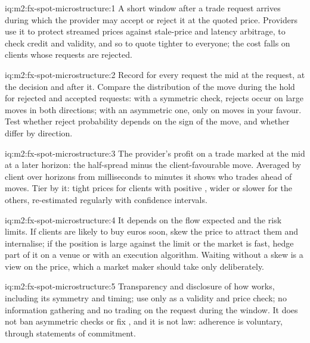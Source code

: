\begin{solution}{iq:m2:fx-spot-microstructure:1}
A short window after a trade request arrives during which the provider may
accept or reject it at the quoted price. Providers use it to protect streamed
prices against stale-price and latency arbitrage, to check credit and validity,
and so to quote tighter to everyone; the cost falls on clients whose requests
are rejected.
\end{solution}

\begin{solution}{iq:m2:fx-spot-microstructure:2}
Record for every request the mid at the request, at the decision and after it.
Compare the distribution of the move during the hold for rejected and accepted
requests: with a symmetric check, rejects occur on large moves in both
directions; with an asymmetric one, only on moves in your favour. Test whether
reject probability depends on the sign of the move, and whether 
differ by direction.
\end{solution}

\begin{solution}{iq:m2:fx-spot-microstructure:3}
The provider's profit on a trade marked at the mid at a later horizon: the
half-spread minus the client-favourable move. Averaged by client over horizons
from milliseconds to minutes it shows who trades ahead of moves. Tier by it:
tight prices for clients with positive , wider or slower for the
others, re-estimated regularly with confidence intervals.
\end{solution}

\begin{solution}{iq:m2:fx-spot-microstructure:4}
It depends on the flow expected and the risk limits. If clients are likely to
buy euros soon, skew the price to attract them and internalise; if the position
is large against the limit or the market is fast, hedge part of it on a venue or
with an execution algorithm. Waiting without a skew is a view on the price,
which a market maker should take only deliberately.
\end{solution}

\begin{solution}{iq:m2:fx-spot-microstructure:5}
Transparency and disclosure of how  works, including its symmetry and
timing; use only as a validity and price check; no information gathering and no
trading on the request during the window. It does not ban asymmetric checks or
fix , and it is not law: adherence is voluntary, through statements of
commitment.
\end{solution}

